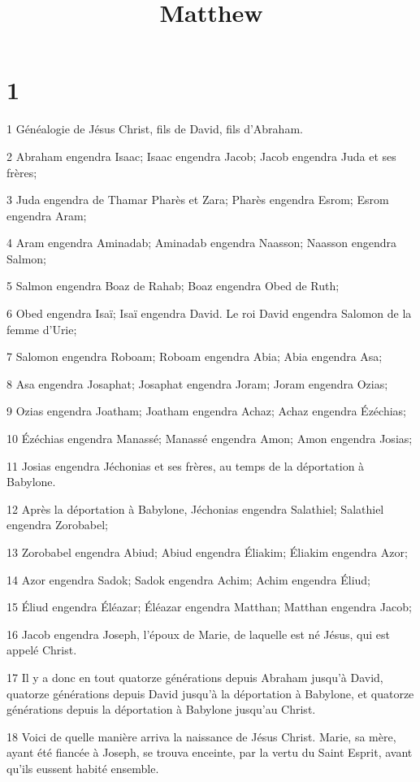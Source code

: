 

\title{Matthew}


\chapter{1}

\par 1 Généalogie de Jésus Christ, fils de David, fils d'Abraham.
\par 2 Abraham engendra Isaac; Isaac engendra Jacob; Jacob engendra Juda et ses frères;
\par 3 Juda engendra de Thamar Pharès et Zara; Pharès engendra Esrom; Esrom engendra Aram;
\par 4 Aram engendra Aminadab; Aminadab engendra Naasson; Naasson engendra Salmon;
\par 5 Salmon engendra Boaz de Rahab; Boaz engendra Obed de Ruth;
\par 6 Obed engendra Isaï; Isaï engendra David. Le roi David engendra Salomon de la femme d'Urie;
\par 7 Salomon engendra Roboam; Roboam engendra Abia; Abia engendra Asa;
\par 8 Asa engendra Josaphat; Josaphat engendra Joram; Joram engendra Ozias;
\par 9 Ozias engendra Joatham; Joatham engendra Achaz; Achaz engendra Ézéchias;
\par 10 Ézéchias engendra Manassé; Manassé engendra Amon; Amon engendra Josias;
\par 11 Josias engendra Jéchonias et ses frères, au temps de la déportation à Babylone.
\par 12 Après la déportation à Babylone, Jéchonias engendra Salathiel; Salathiel engendra Zorobabel;
\par 13 Zorobabel engendra Abiud; Abiud engendra Éliakim; Éliakim engendra Azor;
\par 14 Azor engendra Sadok; Sadok engendra Achim; Achim engendra Éliud;
\par 15 Éliud engendra Éléazar; Éléazar engendra Matthan; Matthan engendra Jacob;
\par 16 Jacob engendra Joseph, l'époux de Marie, de laquelle est né Jésus, qui est appelé Christ.
\par 17 Il y a donc en tout quatorze générations depuis Abraham jusqu'à David, quatorze générations depuis David jusqu'à la déportation à Babylone, et quatorze générations depuis la déportation à Babylone jusqu'au Christ.
\par 18 Voici de quelle manière arriva la naissance de Jésus Christ. Marie, sa mère, ayant été fiancée à Joseph, se trouva enceinte, par la vertu du Saint Esprit, avant qu'ils eussent habité ensemble.
